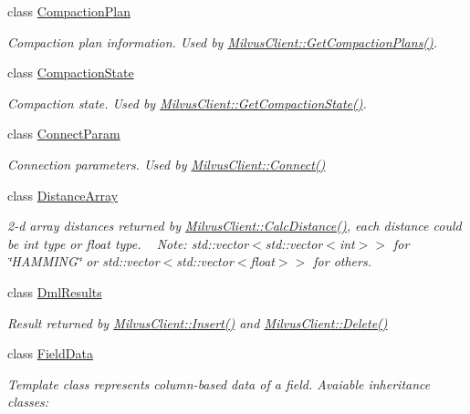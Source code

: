\begin{DoxyCompactItemize}
class \hyperlink{classmilvus_1_1_compaction_plan}{Compaction\+Plan}
\begin{DoxyCompactList}\small\item\em Compaction plan information. Used by \hyperlink{classmilvus_1_1_milvus_client_a39d54736f4b08bba8d6b055277aa71ea}{Milvus\+Client\+::\+Get\+Compaction\+Plans()}. \end{DoxyCompactList}\item 
class \hyperlink{classmilvus_1_1_compaction_state}{Compaction\+State}
\begin{DoxyCompactList}\small\item\em Compaction state. Used by \hyperlink{classmilvus_1_1_milvus_client_a8041cd363470774d2cdb3c295307e1d9}{Milvus\+Client\+::\+Get\+Compaction\+State()}. \end{DoxyCompactList}\item 
class \hyperlink{classmilvus_1_1_connect_param}{Connect\+Param}
\begin{DoxyCompactList}\small\item\em Connection parameters. Used by \hyperlink{classmilvus_1_1_milvus_client_a617f8dbeb20e2bd3da0736f38927d2bb}{Milvus\+Client\+::\+Connect()} \end{DoxyCompactList}\item 
class \hyperlink{classmilvus_1_1_distance_array}{Distance\+Array}
\begin{DoxyCompactList}\small\item\em 2-\/d array distances returned by \hyperlink{classmilvus_1_1_milvus_client_a105c243c7d93ff2cd81b4d9c1751f5fb}{Milvus\+Client\+::\+Calc\+Distance()}, each distance could be int type or float type. ~\newline
Note\+: std\+::vector$<$std\+::vector$<$int$>$$>$ for \char`\"{}\+H\+A\+M\+M\+I\+N\+G\char`\"{} or std\+::vector$<$std\+::vector$<$float$>$$>$ for others. \end{DoxyCompactList}\item 
class \hyperlink{classmilvus_1_1_dml_results}{Dml\+Results}
\begin{DoxyCompactList}\small\item\em Result returned by \hyperlink{classmilvus_1_1_milvus_client_a64a2dca576e0933571a6889910d56390}{Milvus\+Client\+::\+Insert()} and \hyperlink{classmilvus_1_1_milvus_client_a271b16333636621f24aaf89993c72301}{Milvus\+Client\+::\+Delete()} \end{DoxyCompactList}\item 
class \hyperlink{classmilvus_1_1_field_data}{Field\+Data}
\begin{DoxyCompactList}\small\item\em Template class represents column-\/based data of a field. Avaiable inheritance classes\+: ~\newline

\end{DoxyCompactList}
\end{DoxyCompactItemize}
